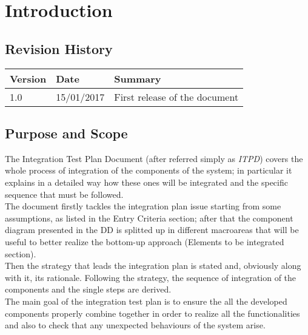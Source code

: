 \documentclass[11pt,a4paper]{report}
\begin{document}


\thispagestyle{empty}
\tableofcontents
\listoffigures
\cleardoublepage
{}
\pagestyle{fancy}

\chapter{Introduction}
\section{Revision History}
\begin{tabularx}{\textwidth}{|l|l|X|}
	\hline
	Version & Date & Summary\\
	\hline
	1.0 & 15/01/2017 & First release of the document\\
	\hline
\end{tabularx}

\section{Purpose and Scope}
The Integration Test Plan Document (after referred simply as \textit{ITPD}) covers the whole process of integration of the components of the system; in particular it explains in a detailed way how these ones will be integrated and the specific sequence that must be followed.\\
The document firstly tackles the integration plan issue starting from some assumptions, as listed in the Entry Criteria section; after that the component diagram presented in the DD is splitted up in different macroareas that will be useful to better realize the bottom-up approach (Elements to be integrated section).\\
Then the strategy that leads the integration plan is stated and, obviously along with it, its rationale. Following the strategy, the sequence of integration of the components and the single steps are derived.\\
The main goal of the integration test plan is to ensure the all the developed components properly combine together in order to realize all the functionalities and also to check that any unexpected behaviours of the system arise.
\end{document}
